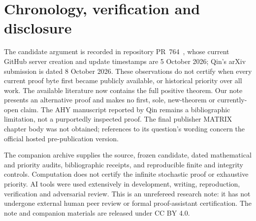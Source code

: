 \documentclass[11pt,a4paper]{article}
\begin{document}
\section*{Chronology, verification and disclosure}

The candidate argument is recorded in repository PR~764~\cite{candidate},
whose current GitHub server creation and update timestamps are 5 October 2026;
Qin's arXiv submission is dated 8 October 2026. These observations do not
certify when every current proof byte first became publicly available, or
historical priority over all work. The available literature now contains the
full positive theorem. Our note presents an alternative proof and makes no
first, sole, new-theorem or currently-open claim. The AHY manuscript reported
by Qin remains a bibliographic limitation, not a purportedly inspected proof.
The final publisher MATRIX chapter body was not obtained; references to its
question's wording concern the official hosted pre-publication version.

The companion archive supplies the source, frozen candidate, dated mathematical
and priority audits, bibliographic receipts, and reproducible finite and
integrity controls. Computation does not certify the infinite stochastic proof
or exhaustive priority. AI tools were used extensively in development, writing,
reproduction, verification and adversarial review. This is an unrefereed
research note: it has not undergone external human peer review or formal
proof-assistant certification. The note and companion materials are released
under CC BY 4.0.
\end{document}
